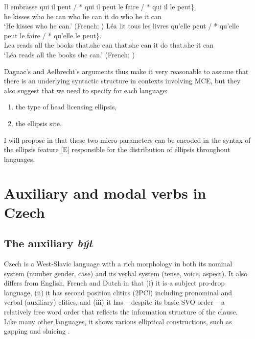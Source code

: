 \documentclass[output=paper,colorlinks,citecolor=brown,
modfonts
]{langscibook}
\begin{document}
\begin{exe}
\ex \label{10}
\begin{xlist}
\ex \label{10a} 
\gll Il embrasse \minsp{\{} qui il peut / *\hspace{-2pt} qui  il  peut  le faire / *\hspace{-2pt} qui  il   le peut\}.\\
he kisses {} who he can  {}  {} who he can it do {}  {} who he it can \\
\glt `He kisses who he can.' \hfill (French; \citealt{Dagnac2008})
\ex \label{10b} 
\gll  Léa lit tous les livres  \minsp{\{} qu'elle peut / *\hspace{-2pt} qu'elle  peut le faire\hspace{20pt}  / *\hspace{-2pt} qu'elle le peut\}. \\
 Lea reads all the books {} {that.she} can {} {} {that.she} can it do {} {} {that.she} it can {}\\
\glt `Léa reads all the books she can.' \hfill (French; \citealt{Dagnac2008})
\end{xlist}
\end{exe}


\noindent Dagnac's and Aelbrecht's arguments thus make it very reasonable to assume that there is an underlying syntactic structure in contexts involving MCE, but they also suggest that we need to specify for each language:
\begin{enumerate}
    \item the type of head licensing ellipsis,
    \item the ellipsis site.
\end{enumerate} 
I will propose in  that these two micro-parameters can be encoded in the syntax of the ellipsis feature [E] responsible for the distribution of ellipsis throughout languages. 


\section{Auxiliary and modal verbs in Czech}\label{sec:3}


\subsection{The auxiliary \textit{být}}\label{sec:3.1}

Czech is a West-Slavic language with a rich morphology in both its nominal system (number gender, case) and its verbal system (tense, voice, aspect). It also differs from English, French and Dutch in that (i) it is a subject pro-drop language, (ii) it has second position clitics (2PCl) including pronominal and verbal (auxiliary) clitics, and (iii) it has -- despite its basic SVO order -- a relatively free word order that reflects the information structure of the clause. Like many other languages, it shows various elliptical constructions, such as gapping and sluicing \citep{Gruet-Skrabalova2016}.
\end{document}
